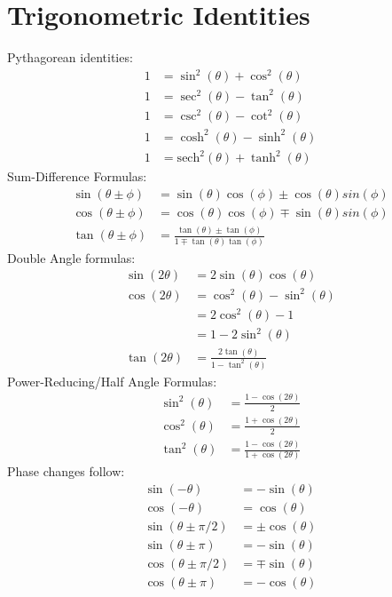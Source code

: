 \newpage
\section{Trigonometric Identities}
\begin{multicols}{2}
Pythagorean identities:
\begin{align}
1 &= \sin^2(\theta)+\cos^2(\theta)\\
1 &= \sec^2(\theta)-\tan^2(\theta) \\
1 &= \csc^2(\theta)-\cot^2(\theta) \\
1 &= \cosh^2(\theta)-\sinh^2(\theta) \\
1 &= \textrm{sech}^2(\theta)+\tanh^2(\theta)
\end{align}
Sum-Difference Formulas:
\begin{align}
\sin(\theta \pm \phi) &= \sin(\theta)\cos(\phi)\pm \cos(\theta)sin(\phi) \\
\cos(\theta \pm \phi) &= \cos(\theta)\cos(\phi)\mp \sin(\theta)sin(\phi) \\
\tan(\theta \pm \phi) &= \frac{\tan(\theta)\pm \tan (\phi)}{1 \mp \tan(\theta)\tan(\phi)}
\end{align}
Double Angle formulas:
\begin{align}
\sin(2\theta) &= 2\sin(\theta)\cos(\theta) \\
\cos(2\theta) &= \cos^2(\theta)-\sin^2(\theta)\\
&= 2\cos^2(\theta)-1 \\
&= 1 - 2\sin^2(\theta) \\
\tan(2\theta) &= \frac{2 \tan(\theta)}{1-\tan^2(\theta)}
\end{align}
Power-Reducing/Half Angle Formulas:
\begin{align}
\sin^2(\theta) &= \frac{1-\cos(2\theta)}{2}\\
\cos^2(\theta) &= \frac{1+\cos(2\theta)}{2}\\
\tan^2(\theta) &= \frac{1-\cos(2\theta)}{1+\cos(2\theta)}
\end{align}
Phase changes follow:
\begin{align}
\sin(-\theta) &=-\sin(\theta) \\
\cos(-\theta) &= \cos(\theta) \\
\sin(\theta\pm \pi/2) &= \pm \cos(\theta) \\
\sin(\theta\pm \pi) &= - \sin(\theta) \\
\cos(\theta\pm \pi/2) &= \mp \sin(\theta) \\
\cos(\theta\pm \pi) &= - \cos(\theta) 

\end{align}
\end{multicols}
